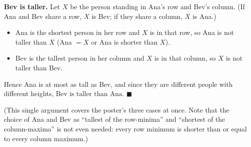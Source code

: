 \textbf{Bev is taller.} Let $X$ be the person standing in Ana's row and Bev's column. (If Ana and Bev share a row, $X$ is Bev; if they share a column, $X$ is Ana.)
\begin{itemize}
\item Ana is the shortest person in her row and $X$ is in that row, so Ana is not taller than $X$ (Ana $=X$ or Ana is shorter than $X$).
\item Bev is the tallest person in her column and $X$ is in that column, so $X$ is not taller than Bev.
\end{itemize}
Hence Ana is at most as tall as Bev, and since they are different people with different heights, $\boxed{\text{Bev is taller than Ana}}$. $\blacksquare$

(This single argument covers the poster's three cases at once. Note that the choice of Ana and Bev as ``tallest of the row-minima'' and ``shortest of the column-maxima'' is not even needed: every row minimum is shorter than or equal to every column maximum.)
